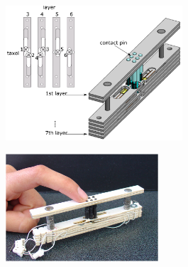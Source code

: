 \begin{figure}\centering
    \begin{subfigure}[b]{0.45\textwidth}\centering
        \includegraphics[height=5cm]{figures/piezo-full-design-a.png}
        \caption{}
    \end{subfigure}
    \begin{subfigure}[b]{0.45\textwidth}\centering
        \includegraphics[height=4cm]{figures/piezo-full-design-b.png}
        \caption{}
    \end{subfigure}
\caption{}
\label{fig:piezo-full-design}
\end{figure}
